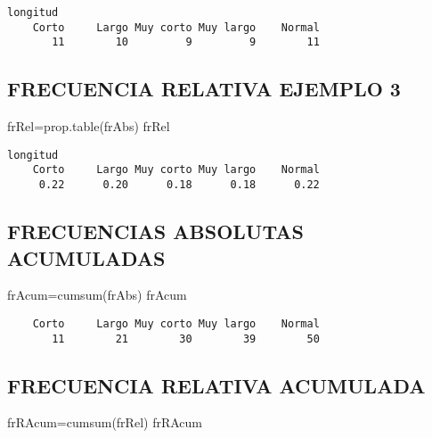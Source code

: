 \documentclass[
]{article}
\newenvironment{Shaded}{\begin{snugshade}}{\end{snugshade}}
\newcommand{\FunctionTok}[1]{\textcolor[rgb]{0.00,0.00,0.00}{#1}}
\newcommand{\NormalTok}[1]{#1}
\newcommand{\OtherTok}[1]{\textcolor[rgb]{0.56,0.35,0.01}{#1}}
\begin{document}
\begin{verbatim}
longitud
    Corto     Largo Muy corto Muy largo    Normal 
       11        10         9         9        11 
\end{verbatim}

\hypertarget{frecuencia-relativa-ejemplo-3}{%
\subsection{FRECUENCIA RELATIVA EJEMPLO
3}\label{frecuencia-relativa-ejemplo-3}}

\begin{Shaded}
\begin{Highlighting}[]
\NormalTok{frRel}\OtherTok{=}\FunctionTok{prop.table}\NormalTok{(frAbs)}
\NormalTok{frRel}
\end{Highlighting}
\end{Shaded}

\begin{verbatim}
longitud
    Corto     Largo Muy corto Muy largo    Normal 
     0.22      0.20      0.18      0.18      0.22 
\end{verbatim}

\hypertarget{frecuencias-absolutas-acumuladas}{%
\subsection{FRECUENCIAS ABSOLUTAS
ACUMULADAS}\label{frecuencias-absolutas-acumuladas}}

\begin{Shaded}
\begin{Highlighting}[]
\NormalTok{frAcum}\OtherTok{=}\FunctionTok{cumsum}\NormalTok{(frAbs)}
\NormalTok{frAcum}
\end{Highlighting}
\end{Shaded}

\begin{verbatim}
    Corto     Largo Muy corto Muy largo    Normal 
       11        21        30        39        50 
\end{verbatim}

\hypertarget{frecuencia-relativa-acumulada}{%
\subsection{FRECUENCIA RELATIVA
ACUMULADA}\label{frecuencia-relativa-acumulada}}

\begin{Shaded}
\begin{Highlighting}[]
\NormalTok{frRAcum}\OtherTok{=}\FunctionTok{cumsum}\NormalTok{(frRel)}
\NormalTok{frRAcum}
\end{Highlighting}
\end{Shaded}
\end{document}
